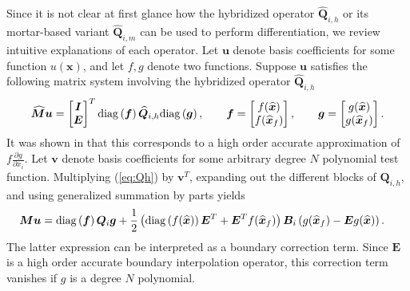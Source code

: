 \documentclass{svjour3}                     %
\renewcommand{\hat}{\widehat}
\newcommand{\diag}[1]{{\rm diag}\LRp{#1}}
\newcommand{\pd}[2]{\frac{\partial#1}{\partial#2}}
\newcommand{\LRp}[1]{\left( #1 \right)}
\begin{document}
Since it is not clear at first glance how the hybridized operator $\hat{\bm{Q}}_{i,h}$ or its mortar-based variant $\hat{\bm{Q}}_{i,m}$ can be used to perform differentiation, we review intuitive explanations of each operator.  Let $\bm{u}$ denote basis coefficients for some function $u(\bm{x})$, and let $f, g$ denote two functions.  Suppose $\bm{u}$ satisfies the following matrix system involving the hybridized operator $\hat{\bm{Q}}_{i,h}$
\begin{align}
\hat{\bm{M}}\bm{u} = \begin{bmatrix}
\bm{I}\\
\bm{E}
\end{bmatrix}^T \diag{\bm{f}}\hat{\bm{Q}}_{i,h} \diag{\bm{g}}, \qquad \bm{f} = \begin{bmatrix} f(\hat{\bm{x}}) \\ f(\hat{\bm{x}}_f)\end{bmatrix}, \qquad \bm{g} = \begin{bmatrix} g(\hat{\bm{x}}) \\ g(\hat{\bm{x}}_f)\end{bmatrix}.
\label{eq:Qh}
\end{align}
It was shown in \cite{chan2017discretely, chan2019skew} that this corresponds to a high order accurate approximation of $f\pd{g}{x_i}$.  Let $\bm{v}$ denote basis coefficients for some arbitrary degree $N$ polynomial test function.  Multiplying (\ref{eq:Qh}) by $\bm{v}^T$, expanding out the different blocks of $\bm{Q}_{i,h}$, and using generalized summation by parts yields
\begin{align*}
\bm{M}\bm{u} &= 
\diag{\bm{f}}\bm{Q}_i\bm{g} + \frac{1}{2}\LRp{\diag{f(\hat{\bm{x}})}\bm{E}^T + \bm{E}^T f(\hat{\bm{x}}_f)}\bm{B}_i \LRp{g(\hat{\bm{x}}_f) - \bm{E} g(\hat{\bm{x}})}.
\end{align*}
The latter expression can be interpreted as a boundary correction term.  Since $\bm{E}$ is a high order accurate boundary interpolation operator, this correction term vanishes if $g$ is a degree $N$ polynomial.  
\end{document}
